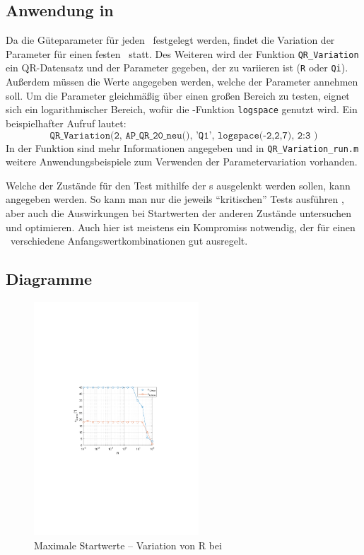 \subsection{Anwendung in \ml}

Da die Güteparameter für jeden \ap\ festgelegt werden, findet die Variation der Parameter für einen festen \ap\ statt.
Des Weiteren wird der Funktion \texttt{QR\_Variation} ein QR-Datensatz und der Parameter gegeben, der zu variieren ist (\texttt{R} oder \texttt{Qi}).
Außerdem müssen die Werte angegeben werden, welche der Parameter annehmen soll.
Um die Parameter gleichmäßig über einen großen Bereich zu testen, eignet sich ein logarithmischer Bereich, wofür die \ml-Funktion \texttt{logspace} genutzt wird. Ein beispielhafter Aufruf lautet:
	\[
	\texttt{QR\_Variation(2, AP\_QR\_20\_neu(), 'Q1', logspace(-2,2,7), 2:3 )}
\]
In der Funktion sind mehr Informationen angegeben und in \texttt{QR\_Variation\_run.m} weitere Anwendungsbeispiele zum Verwenden der Parametervariation vorhanden.

Welche der Zustände für den Test mithilfe der \xots s ausgelenkt werden sollen, kann angegeben werden.
So kann man nur die jeweils "`kritischen"' Tests ausführen , aber auch die Auswirkungen bei Startwerten der anderen Zustände untersuchen und optimieren.
Auch hier ist meistens ein Kompromiss notwendig, der für einen \ap\ verschiedene Anfangswertkombinationen gut ausregelt.


\subsection{Diagramme}

\begin{figure}[htbp]
	\centering
		\includegraphics[width=0.55\textwidth]{Bilder/QRVariation/ap2/R phi12.pdf}
	\caption{Maximale Startwerte -- Variation von R bei \apz}
	\label{fig:qrap2R}
\end{figure}

